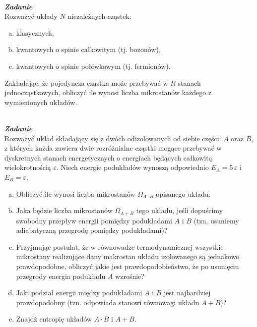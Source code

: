 \documentclass[11pt,a4paper]{article}
\newcounter{zadanie}\newcommand{\zadanie}[1][]{\addtocounter{zadanie}{1} ~\\  {\bf \emph{Zadanie \arabic{zadanie} #1 }} \\}
\begin{document}
\zadanie
Rozważyć układy $N$ niezależnych cząstek:\begin{enumerate}[a)]
\item klasycznych,
\item kwantowych o spinie całkowitym (tj. bozonów),
\item kwantowych o spinie połówkowym (tj. fermionów).
\end{enumerate}
Zakładając, że pojedyncza cząstka może przebywać w $R$ stanach jednocząstkowych, obliczyć ile wynosi liczba mikrostanów każdego z wymienionych układów.
\\[2mm]

\zadanie
Rozważyć układ składający się z dwóch odizolowanych od siebie części: $A$ oraz $B$, 
z których każda zawiera dwie rozróżnialne cząstki mogące przebywać w dyskretnych
stanach energetycznych o energiach będących całkowitą wielokrotnością $\varepsilon$. 
Niech energie podukładów wynoszą odpowiednio $E_A = 5\,\varepsilon$ i $E_B = \varepsilon$. 
\begin{enumerate}[a)]
\item 
Obliczyć ile wynosi liczba mikrostanów $\Omega_{A \cdot B}$ opisanego układu.
\item Jaka będzie liczba mikrostanów $\Omega_{A+B}$ tego układu, jeśli dopuścimy swobodny przepływ
energii pomiędzy podukładami $A$ i $B$ (tzn. usuniemy adiabatyczną przegrodę pomiędzy podukładami)?
\item Przyjmując postulat, że w równowadze termodynamicznej 
wszystkie mikrostany realizujące dany makrostan układu izolowanego są jednakowo
prawdopodobne, obliczyć jakie jest prawdopodobieństwo, że po usunięciu przegrody
energia podukładu $A$ wzrośnie?
\item Jaki podział energii między podukładami $A$ i $B$ jest najbardziej prawdopodobny (tzn. odpowiada stanowi równowagi układu $A + B$)?
\item Znajdź entropię układów $A \cdot B$ i $A+B$. 
\end{enumerate}
\end{document}
